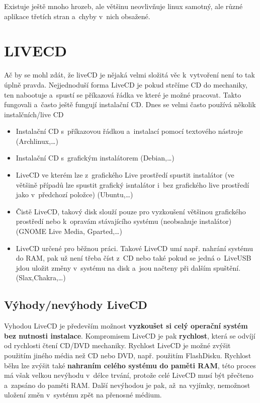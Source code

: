 \documentclass[a4paper,12pt]{article}
\newcommand{\upc}[1]{\uppercase{#1}} %
\begin{document}
Existuje ještě mnoho hrozeb, ale většinu neovlivňuje linux samotný, ale různé aplikace třetích stran a~chyby v~nich obsažené.

\section{\upc{LiveCD}}
Ač by se mohl zdát, že liveCD je nějaká velmi složitá věc k~vytvoření není to tak úplně pravda. Nejjednoduší forma LiveCD je pokud strčíme CD do mechaniky, ten nabootuje a~spustí se příkazová řádka ve které je možné pracovat. Takto fungovali a~často ještě fungují instalační CD. Dnes se velmi často používá několik instalčních/live CD
\begin{itemize}
 \item Instalační CD s~příkazovou řádkou a~instalací pomocí textového nástroje (Archlinux,…)
 \item Instalační CD s~grafickým instalátorem (Debian,…)
 \item LiveCD ve kterém lze z~grafického Live prostředí spustit instalátor (ve většině případů lze spustit grafický isntalátor i~bez grafického live prostředí jako v~předchozí položce) (Ubuntu,…)
 \item Čistě LiveCD, takový disk slouží pouze pro vyzkoušení většinou grafického prostředí nebo k~opravám stávajícího systému (neobsahuje instalátor) (GNOME Live Media, Gparted,…)
 \item LiveCD určené pro běžnou práci. Takové LiveCD umí např. nahrání systému do RAM, pak už není třeba číst z~CD nebo také pokud se jedná o~LiveUSB jdou uložit změny v~systému na disk a~jsou načteny při dalším spuštění. (Slax,Chakra,…)
\end{itemize}

\subsection{Výhody/nevýhody LiveCD}
Vyhodou LiveCD je především možnost \textbf{vyzkoušet si celý operační systém bez nutnosti instalace}. Kompromisem LiveCD je pak \textbf{rychlost}, která se odvíjí od rychlosti čtení CD/DVD mechaniky. Rychlost LiveCD je možné zvýšit použitím jiného média než CD nebo DVD, např. použitím FlashDisku. Rychlost běhu lze zvýšit také \textbf{nahraním celého systému do paměti RAM}, této proces má však velkou nevýhodu v~délce trvání, protože celé LiveCD musí být přečteno a~zapsáno do paměti RAM. Další nevýhodou je pak, až~na vyjímky, nemožnost uložení změn v~systému zpět na přenosné médium.\\
\end{document}

